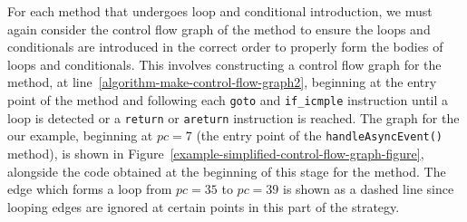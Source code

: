 For each method that undergoes loop and conditional introduction, we
must again consider the control flow graph of the method to ensure the
loops and conditionals are introduced in the correct order to properly
form the bodies of loops and conditionals.
This involves constructing a control flow graph for the method, at
line~\ref{algorithm-make-control-flow-graph2}, beginning at the entry
point of the method and following each \texttt{goto} and
\texttt{if\_icmple} instruction until a loop is detected or a
\texttt{return} or \texttt{areturn} instruction is reached.
The graph for the our example, beginning at $pc=7$ (the entry point of
the \texttt{handleAsyncEvent()} method), is shown in
Figure~\ref{example-simplified-control-flow-graph-figure}, alongside
the \Circus{} code obtained at the beginning of this stage for the
method.
The edge which forms a loop from $pc=35$ to $pc=39$ is shown as a
dashed line since looping edges are ignored at certain points in this
part of the strategy.
